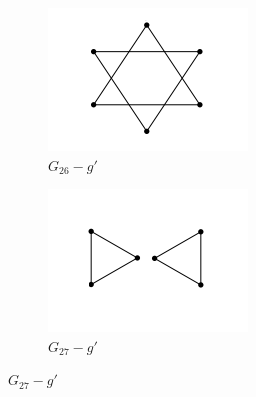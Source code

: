 \documentclass[10pt]{article}
\begin{document}
\begin{itemize}
\begin{enumerate}
\begin{center}
\begin{figure}[h!]
\begin{subfigure}[b]{0.3\linewidth}
	    \includegraphics[width=\linewidth]{stella}
	    \caption{$G_{26} - g'$}
	  \end{subfigure}
	  \begin{subfigure}[b]{0.3\linewidth}
	    \includegraphics[width=\linewidth]{triangoli}
	    \caption{$G_{27} - g'$}
	  \end{subfigure}
	\end{figure}
\end{center}
	

\end{enumerate}
\end{itemize}
\end{document}
